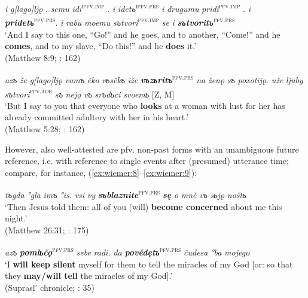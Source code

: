 \documentclass[output=paper,colorlinks,citecolor=brown]{langscibook}
\begin{document}
\ea \label{ex:wiemer:6}
    \textit{i} \textit{g[lago]ljǫ} . \textit{semu} \textit{idi}\textsc{\textsuperscript{ipfv.imp}} . \textit{i} \textit{idetъ}\textsc{\textsuperscript{ipfv.prs}} \textit{i} \textit{drugumu} \textit{pridi}\textsc{\textsuperscript{pfv.imp}} . \textit{i} \textit{\textbf{pridetъ}}\textsc{\textsuperscript{pfv.prs}}. \textit{i} \textit{rabu} \textit{moemu} \textit{sъtvori}\textsc{\textsuperscript{pfv.imp}} \textit{se} \textit{i} \textit{\textbf{sъtvoritъ}}\textsc{\textsuperscript{pfv.prs}}\\
    ‘And I say to this one, “Go!” and he goes, and to another, “Come!” and he \textbf{comes}, and to my slave, “Do this!” and he \textbf{does} it.’\\
    \hfill (Matthew 8:9; \cite{Kamphuis2020}: 162)
\z

\ea \label{ex:wiemer:7}
    \textit{azъ} \textit{že} \textit{g[lago]ljǫ} \textit{vamъ} \textit{ěko} \textit{vьsěkъ} \textit{iže} \textit{\textbf{vъzьritъ}}\textsc{\textsuperscript{pfv.prs}} \textit{na} \textit{ženǫ} \textit{sъ} \textit{poxotijǫ}. \textit{uže} \textit{ljuby} \textit{sъtvori}\textsc{\textsuperscript{pfv.aor}} \textit{sъ} \textit{nejǫ} \textit{vъ} \textit{srъdьci} \textit{svoemь} [Z, M]\\
    ‘But I say to you that everyone who \textbf{looks} at a woman with lust for her has already committed adultery with her in his heart.’\\
    \hfill (Matthew 5:28; \cite{Kamphuis2020}: 162)
\z

However, also well-attested are pfv. non-past forms with an unambiguous future reference, i.e. with reference to single events after (presumed) utterance time; compare, for instance, (\ref{ex:wiemer:8}--\ref{ex:wiemer:9}):

\ea \label{ex:wiemer:8}
    \textit{tъgda} \textit{°gla} \textit{imъ} \textit{°is.} \textit{vsi} \textit{vy} \textit{\textbf{sъblaznite}}\textsc{\textsuperscript{pfv.prs}} \textit{\textbf{sę}} \textit{o} \textit{mně} \textit{vъ} \textit{sьjǫ} \textit{noštь}\\
    ‘Then Jesus told them: all of you (will) \textbf{become concerned} about me this night.’\\
    \hfill (Matthew 26:31; \cite{Večerka1993}: 175)
\z

\ea \label{ex:wiemer:9}
    \textit{azъ} \textit{\textbf{pomlьčǫ}}\textsc{\textsuperscript{pfv.prs}} \textit{sebe} \textit{radi.} \textit{da} \textit{\textbf{povědętъ}}\textsc{\textsuperscript{pfv.prs}} \textit{čudesa} \textit{°ba} \textit{mojego}\\
    ‘I \textbf{will keep silent} myself for them to tell the miracles of my God [or: so that they \textbf{may/will tell} the miracles of my God].’\\
    \hfill (Suprasl’ chronicle; \cite{Ivanova-Mirčeva1962}: 35)
\z
\end{document}
